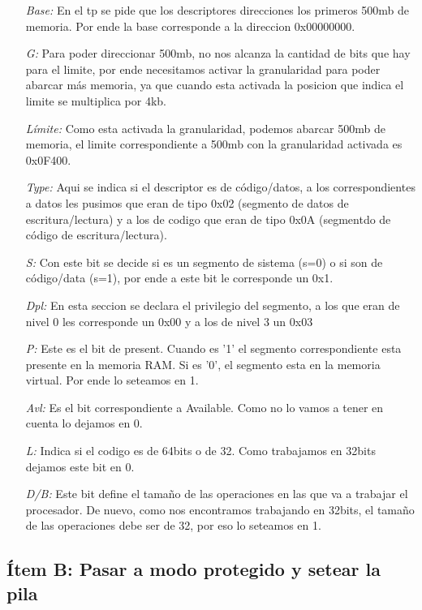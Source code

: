 \begin{itemize}
\item [\textit{Base:}] En el tp se pide que los descriptores direcciones los primeros 500mb de memoria. Por ende la base corresponde a la direccion 0x00000000.
\item [\textit{G:}]  Para poder direccionar 500mb, no nos alcanza la cantidad de bits que hay para el limite, por ende necesitamos activar la granularidad para poder abarcar más memoria, ya que cuando esta activada la posicion que indica el limite se multiplica por 4kb.
\item [\textit{Límite:}] Como esta activada la granularidad, podemos abarcar 500mb de memoria, el limite correspondiente a 500mb con la granularidad activada es 0x0F400.
\item [\textit{Type:}] Aqui se indica si el descriptor es de código/datos, a los correspondientes a datos les pusimos que eran de tipo 0x02 (segmento de datos de escritura/lectura) y a los de codigo que eran de tipo 0x0A (segmentdo de código de escritura/lectura).
\item [\textit{S:}] Con este bit se decide si es un segmento de sistema (s=0) o si son de código/data (s=1), por ende a este bit le corresponde un 0x1.
\item [\textit{Dpl:}] En esta seccion se declara el privilegio del segmento, a los que eran de nivel 0 les corresponde un 0x00 y a los de nivel 3 un 0x03
\item [\textit{P:}] Este es el bit de present. Cuando es ’1’ el segmento correspondiente esta presente en la memoria RAM. Si es ’0’, el segmento esta en la memoria virtual. Por ende lo seteamos en 1.
\item [\textit{Avl:}] Es el bit correspondiente a Available. Como no lo vamos a tener en cuenta lo dejamos en 0.
\item [\textit{L:}] Indica si el codigo es de 64bits o de 32. Como trabajamos en 32bits dejamos este bit en 0.
\item [\textit{D/B:}] Este bit define el tamaño de las operaciones en las que va a trabajar el procesador. De nuevo, como nos encontramos trabajando en 32bits, el tamaño de las operaciones debe ser de 32, por eso lo seteamos en 1.
\end{itemize}

\subsection{Ítem B: Pasar a modo protegido y setear la pila}









